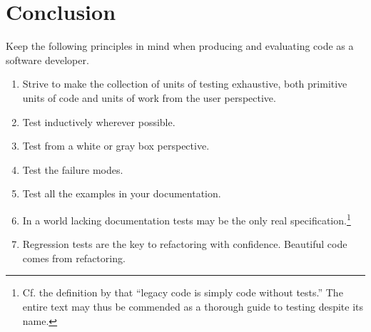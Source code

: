 \documentclass[twoside]{article}
\begin{document}
\section{Conclusion}

Keep the following principles in mind when producing and evaluating code as a software developer.

\begin{enumerate}
  \item  Strive to make the collection of units of testing exhaustive, both primitive units of code and units of work from the user perspective.
  \item  Test inductively wherever possible.
  \item  Test from a white or gray box perspective.
  \item  Test the failure modes.
  \item  Test all the examples in your documentation.
  \item  In a world lacking documentation tests may be the only real specification.\footnote{Cf. the definition by \citeauthor[p. xvi]{Feathers2005} that “legacy code is simply code without tests.”  The entire text may thus be commended as a thorough guide to testing despite its name.}
  \item  Regression tests are the key to refactoring with confidence. Beautiful code comes from refactoring.
\end{enumerate}

\printbibliography
\end{document}
